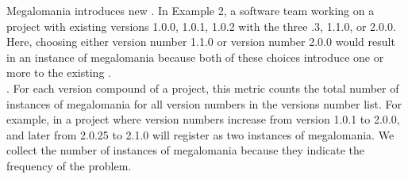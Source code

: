 \documentclass[conference]{IEEEtran}
\begin{document}
Megalomania introduces new \numberchoices.
In Example 2, a software team working on a project with existing versions 1.0.0, 1.0.1, 1.0.2 with the three .3, 1.1.0, or 2.0.0. 
Here, choosing either version number 1.1.0 or version number 2.0.0 would result in an instance of megalomania because both of these choices introduce one or more \choices to the existing \choices. \\





%
%

%

.  
For each version compound of a project, this metric counts the total number of instances of megalomania for all version numbers in the versions number list. 
For example, in a project where version numbers increase from version 1.0.1 to 2.0.0, and later from 2.0.25 to 2.1.0 will register as two instances of megalomania.
We collect the number of instances of megalomania because they indicate the frequency of the problem. \\
\end{document}

